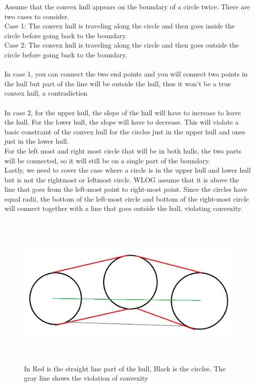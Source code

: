 \documentclass[11pt,psfig]{article}
\begin{document}
Assume that the convex hull appears on the boundary of a circle twice. There are two cases to consider.\\
Case 1: The convex hull is traveling along the circle and then goes inside the circle before going back to the boundary. \\
Case 2: The convex hull is traveling along the circle and then goes outside the circle before going back to the boundary.\\
\\
In case 1, you can connect the two end points and you will connect two points in the hull but part of the line will be outside the hull, thus it won't be a true convex hull, a contradiction\\
\\
In case 2, for the upper hull, the slope of the hull will have to increase to leave the hull. For the lower hull, the slope will have to decrease. This will violate a basic constraint of the convex hull for the circles just in the upper hull and ones just in the lower hull. \\
For the left most and right most circle that will be in both hulls, the two parts will be connected, so it will still be on a single part of the boundary.\\
Lastly, we need to cover the case where a circle is in the upper hull and lower hull but is not the rightmost or leftmost circle. WLOG assume that it is above the line that goes from the left-most point to right-most point. Since the circles have equal radii, the bottom of the left-most circle and bottom of the right-most circle will connect together with a line that goes outside the hull, violating convexity.\\
\begin{figure}[H]
\centering
\includegraphics[height=3in]{hw1prob1-10b_1.jpg}
\caption{In Red is the straight line part of the hull, Black is the circles. The gray line shows the violation of convexity}
\end{figure}
\end{document}
